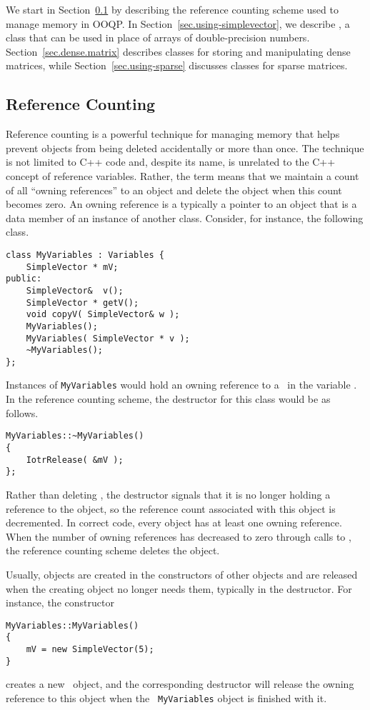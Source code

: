 We start in Section~\ref{sec.ref.counting} by describing the reference
counting scheme used to manage memory in OOQP. In
Section~\ref{sec.using-simplevector}, we describe \SimpleVector, a
class that can be used in place of arrays of double-precision numbers.
Section~\ref{sec.dense.matrix} describes classes for storing and
manipulating dense matrices, while Section~\ref{sec.using-sparse}
discusses classes for sparse matrices.

\subsection{Reference Counting}
\label{sec.ref.counting}

Reference counting is a powerful technique for managing memory that
helps prevent objects from being deleted accidentally or more than
once. The technique is not limited to C++ code and, despite its name,
is unrelated to the C++ concept of reference variables.  Rather, the
term means that we maintain a count of all ``owning references'' to an
object and delete the object when this count becomes zero.  An owning
reference is a typically a pointer to an object that is a data member
of an instance of another class. Consider, for instance, the following
class.
\begin{verbatim}
class MyVariables : Variables {
    SimpleVector * mV;
public:
    SimpleVector&  v();
    SimpleVector * getV();
    void copyV( SimpleVector& w );
    MyVariables();
    MyVariables( SimpleVector * v );
    ~MyVariables();
};
\end{verbatim}
Instances of \texttt{MyVariables} would hold an owning reference to a
\SimpleVector\ in the variable \mV. In the reference counting scheme,
the destructor for this class would be as follows.
\begin{verbatim}
MyVariables::~MyVariables()
{
    IotrRelease( &mV );
};
\end{verbatim}
Rather than deleting \mV, the destructor signals that it is no longer
holding a reference to the object, so the reference count associated
with this object is decremented. In correct code, every object has at
least one owning reference. When the number of owning references has
decreased to zero through calls to \IotrRelease, the reference
counting scheme 
deletes the object.

Usually, objects are created in the constructors of other objects and
are released when the creating object no longer needs them, typically
in the destructor.  For instance, the constructor
\begin{verbatim}
MyVariables::MyVariables()
{
    mV = new SimpleVector(5);
}
\end{verbatim}
creates a new \SimpleVector\ object, and the corresponding destructor
will release the owning reference to this object when the {\tt
MyVariables} object is finished with it.

